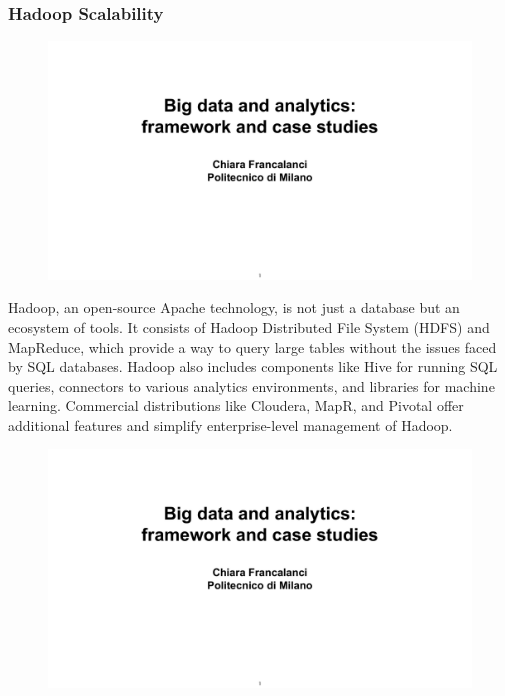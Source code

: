 \subsubsection{Hadoop Scalability}

\begin{figure}[!h]
    \centering
    \includegraphics[page=48, trim = 1.5cm 7cm 1.5cm 5cm, clip, width=\textwidth]{images/06 - BIG_DATA.pdf}
\end{figure}

Hadoop, an open-source Apache technology, is not just a database but an
ecosystem of tools. It consists of Hadoop Distributed File System (HDFS)
and MapReduce, which provide a way to query large tables without the
issues faced by SQL databases. Hadoop also includes components like Hive
for running SQL queries, connectors to various analytics environments,
and libraries for machine learning. Commercial distributions like
Cloudera, MapR, and Pivotal offer additional features and simplify
enterprise-level management of Hadoop.

\begin{figure}[!h]
    \centering
    \includegraphics[page=47, trim = 1.5cm 2cm 3cm 5cm, clip, width=\textwidth]{images/06 - BIG_DATA.pdf}
\end{figure}

